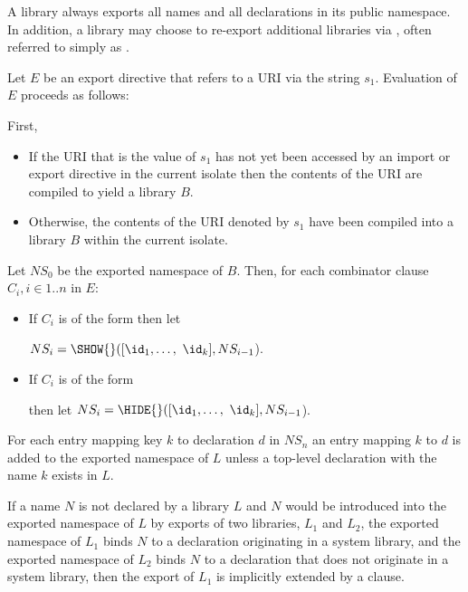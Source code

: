 \documentclass[makeidx]{article}
\begin{document}
{\LMHash{}%
A library always exports all names and all declarations in its public namespace.
In addition, a library may choose to re-export additional libraries via , often referred to simply as .

\LMHash{}%
Let $E$ be an export directive that refers to a URI via the string $s_1$.
Evaluation of $E$ proceeds as follows:

\LMHash{}%
First,

\begin{itemize}
\item
If the URI that is the value of $s_1$ has not yet been accessed by an import or export directive in the current isolate then the contents of the URI are compiled to yield a library $B$.
\item Otherwise, the contents of the URI denoted by $s_1$ have been compiled into a library $B$ within the current isolate.
\end{itemize}

\LMHash{}%
Let $NS_0$ be the exported namespace of $B$.
Then, for each combinator clause $C_i, i \in 1 .. n$ in $E$:
\begin{itemize}
\item If $C_i$ is of the form  then let

$NS_i = \SHOW{}([\id_1, \ldots,\ \id_k], NS_{i-1}$).
\item If $C_i$ is of the form 

then let $NS_i = \HIDE{}([\id_1, \ldots,\ \id_k], NS_{i-1}$).
\end{itemize}

\LMHash{}%
For each
entry mapping key $k$ to declaration $d$ in $NS_n$ an entry mapping $k$ to $d$ is added to the exported namespace of $L$ unless a top-level declaration with the name $k$ exists in $L$.

\LMHash{}%
If a name $N$ is not declared by a library $L$
and $N$ would be introduced into the exported namespace of $L$
by exports of two libraries, $L_1$ and $L_2$,
the exported namespace of $L_1$ binds $N$ to a declaration originating in a system library,
and the exported namespace of $L_2$ binds $N$ to a declaration
that does not originate in a system library,
then the export of $L_1$ is implicitly extended by a  clause.


}
\end{document}
